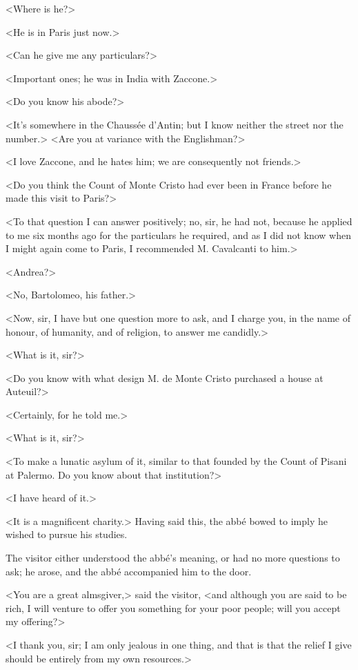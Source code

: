  <Where is he?> 

 <He is in Paris just now.> 

 <Can he give me any particulars?> 

 <Important ones; he was in India with Zaccone.> 

 <Do you know his abode?> 

 <It's somewhere in the Chaussée d'Antin; but I know neither the street nor the number.>  <Are you at variance with the Englishman?> 

 <I love Zaccone, and he hates him; we are consequently not friends.> 

 <Do you think the Count of Monte Cristo had ever been in France before he made this visit to Paris?> 

 <To that question I can answer positively; no, sir, he had not, because he applied to me six months ago for the particulars he required, and as I did not know when I might again come to Paris, I recommended M. Cavalcanti to him.> 

 <Andrea?> 

 <No, Bartolomeo, his father.> 

 <Now, sir, I have but one question more to ask, and I charge you, in the name of honour, of humanity, and of religion, to answer me candidly.> 

 <What is it, sir?> 

 <Do you know with what design M. de Monte Cristo purchased a house at Auteuil?> 

 <Certainly, for he told me.> 

 <What is it, sir?> 

 <To make a lunatic asylum of it, similar to that founded by the Count of Pisani at Palermo. Do you know about that institution?> 

 <I have heard of it.> 

 <It is a magnificent charity.> Having said this, the abbé bowed to imply he wished to pursue his studies. 

 The visitor either understood the abbé's meaning, or had no more questions to ask; he arose, and the abbé accompanied him to the door. 

 <You are a great almsgiver,> said the visitor, <and although you are said to be rich, I will venture to offer you something for your poor people; will you accept my offering?> 

 <I thank you, sir; I am only jealous in one thing, and that is that the relief I give should be entirely from my own resources.> 

